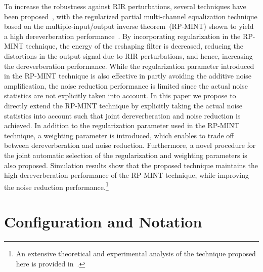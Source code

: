 \documentclass{aes60i}
\begin{document}
\newline
To increase the robustness against RIR perturbations, several techniques have been proposed~\cite{Zhang_IWAENC_2010,Kodrasi_ITASLP_2013,Lim_ITASLP_2014}, with the regularized partial multi-channel equalization technique based on the multiple-input/output inverse theorem~(RP-MINT) shown to yield a high dereverberation performance~\cite{Kodrasi_ITASLP_2013}.
By incorporating regularization in the RP-MINT technique, the energy of the reshaping filter is decreased, reducing the distortions in the output signal due to RIR perturbations, and hence, increasing the dereverberation performance. 
While the regularization parameter introduced in the RP-MINT technique is also effective in partly avoiding the additive noise amplification, the noise reduction performance is limited since the actual noise statistics are not explicitly taken into account.
\newline
In this paper we propose to directly extend the RP-MINT technique by explicitly taking the actual noise statistics into account such that joint dereverberation and noise reduction is achieved. 
In addition to the regularization parameter used in the RP-MINT technique, a weighting parameter is introduced, which enables to trade off between dereverberation and noise reduction.
Furthermore, a novel procedure for the joint automatic selection of the regularization and weighting parameters is also proposed.
Simulation results show that the proposed technique maintains the high dereverberation performance of the RP-MINT technique, while improving the noise reduction performance.\footnote{An extensive theoretical and experimental analysis of the technique proposed here is provided in~\cite{Kodrasi_ITASLP_2015}.}

\section{Configuration and Notation}
\end{document}
